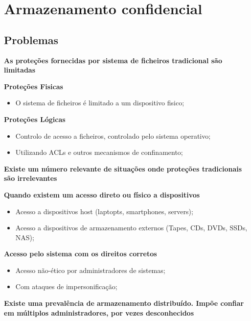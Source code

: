 \documentclass{article}
\begin{document}
\pagebreak

\section{Armazenamento confidencial}

\subsection{Problemas}

\textbf{As proteções fornecidas por sistema de ficheiros
tradicional são limitadas}

\begin{flushleft}
  \textbf{Proteções Fisicas}
  \begin{itemize}
    \item O sistema de ficheiros é limitado a um dispositivo fisico;
  \end{itemize}

  \textbf{Proteções Lógicas}
  \begin{itemize}
    \item Controlo de acesso a ficheiros, controlado pelo sistema operativo;
    \item Utilizando ACLs e outros mecanismos de confinamento;
  \end{itemize}
\end{flushleft}

\textbf{Existe um número relevante de situações onde proteções
tradicionais são irrelevantes}

\begin{flushleft}
  \textbf{Quando existem um acesso direto ou físico a dispositivos}
  \begin{itemize}
    \item Acesso a dispositivos host (laptopts, smartphones, servers);
    \item Acesso a dispositivos de armazenamento  externos
    (Tapes, CDs, DVDs, SSDs, NAS);
  \end{itemize}

  \textbf{Acesso pelo sistema com os direitos corretos}
  \begin{itemize}
    \item Acesso não-ético por administradores de sistemas;
    \item Com ataques de impersonificação;
  \end{itemize}
\end{flushleft}

\textbf{Existe uma prevalência de armazenamento distribuído.
Impõe confiar em múltiplos administradores, por vezes desconhecidos}
\end{document}
